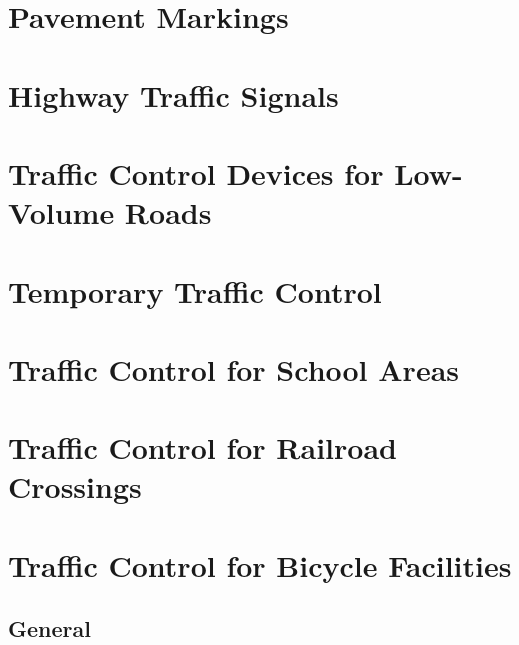 \documentclass[9pt]{memoir}
\begin{document}
\part{Pavement Markings}



\part{Highway Traffic Signals}



\part{Traffic Control Devices for Low-Volume Roads}



\part{Temporary Traffic Control}



\part{Traffic Control for School Areas}



\part{Traffic Control for Railroad Crossings}



\part{Traffic Control for Bicycle Facilities}



\renewcommand{\thechapter}{\arabic{chapter}}

\listoffigures


\chapter{General}
\end{document}
